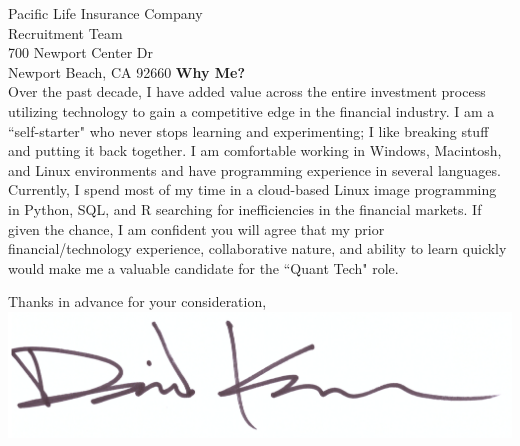 \documentclass{letter}
\begin{document}
\begin{letter}{
  Pacific Life Insurance Company \\
  Recruitment Team \\
  700 Newport Center Dr \\
  Newport Beach, CA 92660 
}
\textbf{Why Me?} \\
Over the past decade, I have added value across the entire investment process
utilizing technology to gain a competitive edge in the financial industry.
I am a ``self-starter" who never stops learning and experimenting; I like breaking
stuff and putting it back together. I am comfortable working in Windows, Macintosh,
and Linux environments and have programming experience in several languages. Currently,
I spend most of my time in a cloud-based Linux image programming in Python, SQL,
and R searching for inefficiencies in the financial markets. If given the chance,
I am confident you will agree that my  prior financial/technology experience,
collaborative nature, and ability to learn quickly would make me a valuable
candidate for the ``Quant Tech" role. \\
 
\closing{
  Thanks in advance for your consideration, \\
  \vspace{.33in}
  \includegraphics[scale=0.33]{signature.png}
}

\end{letter}
\end{document}
